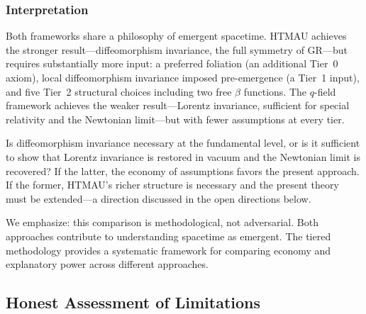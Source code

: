 \documentclass[aps,prd,twocolumn,showpacs,superscriptaddress,preprintnumbers]{revtex4-2}
\begin{document}
\subsubsection{Interpretation}

Both frameworks share a philosophy of emergent spacetime.
HTMAU achieves the stronger result---diffeomorphism invariance, the full symmetry of GR---but requires substantially more input: a preferred foliation (an additional Tier~0 axiom), local diffeomorphism invariance imposed pre-emergence (a Tier~1 input), and five Tier~2 structural choices including two free $\beta$ functions.
The $q$-field framework achieves the weaker result---Lorentz invariance, sufficient for special relativity and the Newtonian limit---but with fewer assumptions at every tier.

Is diffeomorphism invariance necessary at the fundamental level, or is it sufficient to show that Lorentz invariance is restored in vacuum and the Newtonian limit is recovered?
If the latter, the economy of assumptions favors the present approach.
If the former, HTMAU's richer structure is necessary and the present theory must be extended---a direction discussed in the open directions below.

We emphasize: this comparison is methodological, not adversarial.
Both approaches contribute to understanding spacetime as emergent.
The tiered methodology provides a systematic framework for comparing economy and explanatory power across different approaches.

\subsection{Honest Assessment of Limitations}
\end{document}
